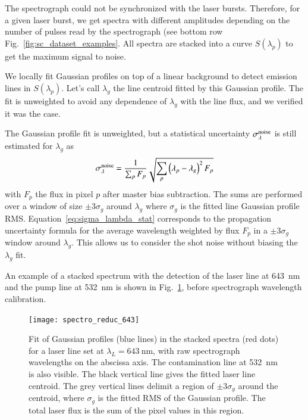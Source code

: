 The spectrograph could not be synchronized with the laser bursts. Therefore, for a given laser burst, we get spectra with different amplitudes depending on the number of pulses read by the spectrograph (see bottom row Fig.~\ref{fig:sc_dataset_examples}.
All spectra are stacked into a curve $S(\lambda_p)$ to get the maximum signal to noise.

We locally fit Gaussian profiles on top of a linear background to detect emission lines in $S(\lambda_p)$. Let's call $\lambda_g$ the line centroid fitted by this Gaussian profile. The fit is unweighted to avoid any dependence of $\lambda_g$ with the line flux, and we verified it was the case. 

The Gaussian profile fit is unweighted, but a statistical uncertainty $\sigma_\lambda^{\rm noise}$ is still estimated for $\lambda_g$ as 
\begin{equation}\label{eq:sigma_lambda_stat}
    \sigma_\lambda^{\rm noise}= \dfrac{1}{\sum_p F_p} \sqrt{\sum_p \left(\lambda_p - \lambda_g\right)^2 F_p}
\end{equation}
with $F_p$ the flux in pixel $p$ after master bias subtraction. The sums are performed over a window of size $\pm 3 \sigma_g$ around $\lambda_g$ where $\sigma_g$ is the fitted line Gaussian profile RMS. Equation~\ref{eq:sigma_lambda_stat} corresponds to the propagation uncertainty formula for the average wavelength weighted by flux $F_p$ in a $\pm 3 \sigma_g$  window around $\lambda_g$. This allows us to consider the shot noise without biasing the $\lambda_g$ fit.

An example of a stacked spectrum with the detection of the laser line at \SI{643}{\nm} and the pump line at \SI{532}{\nm} is shown in Fig.~\ref{fig:spectro_reduc_643}, before spectrograph wavelength calibration. %

\begin{figure}%
\centering
\texttt{[image: spectro\_reduc\_643]}
\caption{Fit of Gaussian profiles (blue lines) in the stacked spectra (red dots) for a laser line set at $\lambda_L=\SI{643}{\nm}$, with raw spectrograph wavelengths on the abscissa axis. The contamination line at \SI{532}{nm} is also visible. The black vertical line gives the fitted laser line centroid. The grey vertical lines delimit a region of $\pm 3\sigma_g$ around the centroid, where $\sigma_g$ is the fitted RMS of the Gaussian profile. The total laser flux is the sum of the pixel values in this region.}\label{fig:spectro_reduc_643}
\end{figure}



